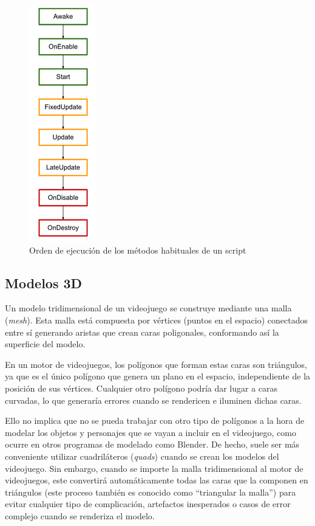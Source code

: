 \begin{figure}[h]
	\centering
	\includegraphics[scale=1]{img/ExecutionOrder.png}
	\caption{Orden de ejecución de los métodos habituales de un script}
	\label{fig:ordenEjecucion}
\end{figure}
\subsection{Modelos 3D}
Un modelo tridimensional de un videojuego se construye mediante una malla (\textit{mesh}). Esta malla está compuesta por vértices (puntos en el espacio) conectados entre sí generando aristas que crean caras poligonales, conformando así la superficie del modelo.

En un motor de videojuegos, los polígonos que forman estas caras son triángulos, ya que es el único polígono que genera un plano en el espacio, independiente de la posición de sus vértices. Cualquier otro polígono podría dar lugar a caras curvadas, lo que generaría errores cuando se rendericen e iluminen dichas caras.

Ello no implica que no se pueda trabajar con otro tipo de polígonos a la hora de modelar los objetos y personajes que se vayan a incluir en el videojuego, como ocurre en otros programas de modelado como Blender. De hecho, suele ser más conveniente utilizar cuadriláteros (\textit{quads}) cuando se crean los modelos del videojuego.
Sin embargo, cuando se importe la malla tridimensional al motor de videojuegos, este convertirá automáticamente todas las caras que la componen en triángulos (este proceso también es conocido como “triangular la malla”) para evitar cualquier tipo de complicación, artefactos inesperados o casos de error complejo cuando se renderiza el modelo.

